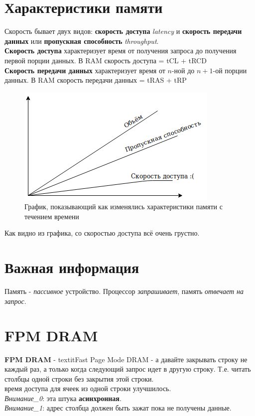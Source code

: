 \documentclass[12pt, a4paper]{article}
\begin{document}
\section{Характеристики памяти}
Скорость бывает двух видов: \textbf{скорость доступа} \textit{latency} и \textbf{скорость передачи данных} или \textbf{пропускная способность} \textit{throughput}.\\
\textbf{Скорость доступа} характеризует время от получения запроса до получения первой порции данных. В RAM скорость доступа = tCL + tRCD\\
\textbf{Скорость передачи данных} характеризует время от $n$-ной до $n+1$-ой порции данных. В RAM скорость передачи данных = tRAS + tRP\\
\begin{figure}[h]
    \centering
    \includegraphics[scale=0.4]{./images/graphic.png}
    \caption{График, показывающий как изменялись характеристики памяти с течением времени}
    \label{fig:SDR_SDRAM}
\end{figure}
Как видно из графика, со скоростью доступа всё очень грустно.
\section{Важная информация}
Память - \textit{пассивное} устройство. Процессор \textit{запрашивает}, память \textit{отвечает на запрос}.
\section{FPM DRAM}
\textbf{FPM DRAM} - textit{Fast Page Mode DRAM} - а давайте закрывать строку не каждый раз, а только когда следующий запрос идет в другую строку. Т.е. читать столбцы одной строки без закрытия этой строки.\\
время доступа для ячеек из одной строки улучшилось.\\
\textit{Внимание\_0}: эта штука \textbf{асинхронная}.\\
\textit{Внимание\_1}: адрес столбца должен быть зажат пока не получены данные.
\end{document}
